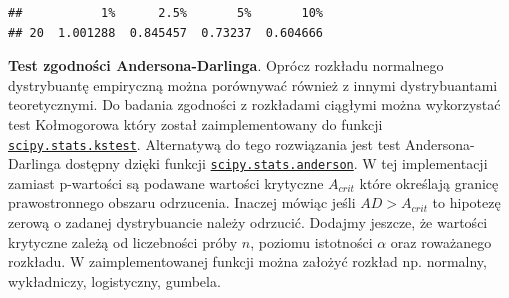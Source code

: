 \documentclass[polish,]{book}
\newenvironment{Shaded}{\begin{snugshade}}{\end{snugshade}}
\newcommand{\BuiltInTok}[1]{#1}
\newcommand{\ControlFlowTok}[1]{\textcolor[rgb]{0.13,0.29,0.53}{\textbf{#1}}}
\newcommand{\DecValTok}[1]{\textcolor[rgb]{0.00,0.00,0.81}{#1}}
\newcommand{\FloatTok}[1]{\textcolor[rgb]{0.00,0.00,0.81}{#1}}
\newcommand{\ImportTok}[1]{#1}
\newcommand{\KeywordTok}[1]{\textcolor[rgb]{0.13,0.29,0.53}{\textbf{#1}}}
\newcommand{\NormalTok}[1]{#1}
\newcommand{\OperatorTok}[1]{\textcolor[rgb]{0.81,0.36,0.00}{\textbf{#1}}}
\newcommand{\StringTok}[1]{\textcolor[rgb]{0.31,0.60,0.02}{#1}}
\begin{document}
\begin{Shaded}
\end{Shaded}

\begin{verbatim}
##           1%      2.5%       5%       10%
## 20  1.001288  0.845457  0.73237  0.604666
\end{verbatim}

\textbf{Test zgodności Andersona-Darlinga}. Oprócz rozkładu normalnego dystrybuantę empiryczną można porównywać również z innymi dystrybuantami teoretycznymi. Do badania zgodności z rozkładami ciągłymi można wykorzystać test Kołmogorowa który został zaimplementowany do funkcji \href{https://docs.scipy.org/doc/scipy/reference/generated/scipy.stats.kstest.html\#scipy.stats.kstest}{\texttt{scipy.stats.kstest}}. Alternatywą do tego rozwiązania jest test Andersona-Darlinga dostępny dzięki funkcji \href{https://docs.scipy.org/doc/scipy/reference/generated/scipy.stats.anderson.html\#scipy.stats.anderson}{\texttt{scipy.stats.anderson}}. W tej implementacji zamiast p-wartości są podawane wartości krytyczne \(A_{crit}\) które określają granicę prawostronnego obszaru odrzucenia. Inaczej mówiąc jeśli \(AD>A_{crit}\) to hipotezę zerową o zadanej dystrybuancie należy odrzucić. Dodajmy jeszcze, że wartości krytyczne zależą od liczebności próby \(n\), poziomu istotności \(\alpha\) oraz roważanego rozkładu. W zaimplementowanej funkcji można założyć rozkład np. normalny, wykładniczy, logistyczny, gumbela.
\end{document}
